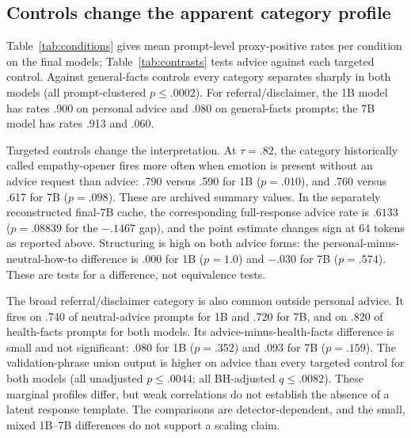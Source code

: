 \documentclass[11pt]{article}
\begin{document}
\subsection{Controls change the apparent category profile}
\label{sec:decomposition}

Table~\ref{tab:conditions} gives mean prompt-level proxy-positive rates per condition on
the final models; Table~\ref{tab:contrasts} tests advice against each targeted
control. Against general-facts controls every category separates sharply in both
models (all prompt-clustered $p\leq.0002$). For referral/disclaimer, the 1B
model has rates .900 on personal advice and .080 on general-facts prompts; the 7B model has
rates .913 and .060.

Targeted controls change the interpretation. At $\tau=.82$, the category
historically called empathy-opener fires more often when emotion is present without an advice request than
advice: .790 versus .590 for 1B ($p=.010$), and .760 versus .617 for 7B
($p=.098$). These are archived summary values. In the separately reconstructed
final-7B cache, the corresponding full-response advice rate is $.6133$
($p=.08839$ for the $-.1467$ gap), and the point estimate changes sign at 64
tokens as reported above. Structuring is high on both advice forms: the personal-minus-
neutral-how-to difference is .000 for 1B ($p=1.0$) and $-.030$ for 7B
($p=.574$). These are tests for a difference, not equivalence tests.

The broad referral/disclaimer category is also common outside personal advice.
It fires on .740 of neutral-advice prompts for 1B and .720 for 7B, and on .820
of health-facts prompts for both models. Its advice-minus-health-facts
difference is small and not significant: .080 for 1B ($p=.352$) and .093 for
7B ($p=.159$). The validation-phrase union output is higher on advice than every
targeted control for both models (all unadjusted $p\leq.0044$; all BH-adjusted
$q\leq.0082$). These marginal profiles differ, but weak correlations do not
establish the absence of a latent response template. The comparisons are
detector-dependent, and the small, mixed 1B--7B differences do not support a
scaling claim.
\end{document}
